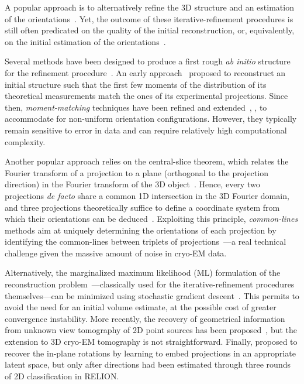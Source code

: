 
A popular approach is to alternatively refine the 3D structure and an estimation of the orientations~\cite{penczek1994ribosome,Baker1996,Dempster1977,sigworth1998maximum,scheres2012bayesian,zehni2020joint}.
Yet, the outcome of these iterative-refinement procedures is still often predicated on the quality of the initial reconstruction, or, equivalently, on the initial estimation of the orientations~\cite{sorzano2006optimization,henderson2012outcome}.

Several methods have been designed to produce a first rough \textit{ab initio} structure for the refinement procedure~\cite{singer2020computational}.
An early approach~\cite{kam1980reconstruction} proposed to reconstruct an initial structure such that the first few moments of the distribution of its theoretical measurements match the ones of its experimental projections.
Since then, \textit{moment-matching} techniques have been refined and extended~\cite{salzman1990method,goncharov1988integral,sharon2019method}, \eg, to accommodate for non-uniform orientation configurations.
However, they typically remain sensitive to error in data and can require relatively high computational complexity.

Another popular approach relies on the central-slice theorem, which relates the Fourier transform of a projection to a plane (orthogonal to the projection direction) in the Fourier transform of the 3D object~\cite{Natterer2001mathematics}.
Hence, every two projections \textit{de facto} share a common 1D intersection in the 3D Fourier domain, and three projections theoretically suffice to define a coordinate system from which their orientations can be deduced~\cite{van1987angular}.
Exploiting this principle, \textit{common-lines} methods aim at uniquely determining the orientations of each projection by identifying the common-lines between triplets of projections~\cite{penczek1994ribosome,mallick2006structure,singer2010detecting,wang2013orientation,greenberg2017common,pragier2019common}---a real technical challenge given the massive amount of noise in cryo-EM data.

Alternatively, the marginalized maximum likelihood (ML) formulation of the reconstruction problem~\cite{sigworth1998maximum}---classically used for the iterative-refinement procedures themselves---can be minimized using stochastic gradient descent~\cite{punjani2017cryosparc}.
This permits to avoid the need for an initial volume estimate, at the possible cost of greater convergence instability.
More recently, the recovery of geometrical information from unknown view tomography of 2D point sources has been proposed~\cite{zehni2019distance}, but the extension to 3D cryo-EM tomography is not straightforward.
Finally, \cite{miolane2019estimation} proposed to recover the in-plane rotations by learning to embed projections in an appropriate latent space, but only after directions had been estimated through three rounds of 2D classification in RELION\@.

